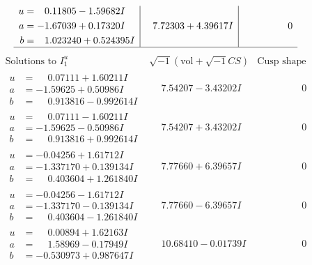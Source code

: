 \documentclass[1p]{elsarticle_modified}
\theoremstyle{definition}
\newcommand{\I}{\sqrt{-1}}
\begin{document}
$$\begin{array}{c|c|c}
\begin{aligned}
u &= \phantom{-}0.11805 - 1.59682 I \\
a &= -1.67039 + 0.17320 I \\
b &= \phantom{-}1.023240 + 0.524395 I\end{aligned}
 & \phantom{-}7.72303 + 4.39617 I & \phantom{-0.000000 } 0\\
 \hline 
 \end{array}$$\newpage$$\begin{array}{c|c|c}  
\text{Solutions to }I^u_{1}& \I (\text{vol} + \sqrt{-1}CS) & \text{Cusp shape}\\
 \hline 
\begin{aligned}
u &= \phantom{-}0.07111 + 1.60211 I \\
a &= -1.59625 + 0.50986 I \\
b &= \phantom{-}0.913816 - 0.992614 I\end{aligned}
 & \phantom{-}7.54207 - 3.43202 I & \phantom{-0.000000 } 0 \\ \hline\begin{aligned}
u &= \phantom{-}0.07111 - 1.60211 I \\
a &= -1.59625 - 0.50986 I \\
b &= \phantom{-}0.913816 + 0.992614 I\end{aligned}
 & \phantom{-}7.54207 + 3.43202 I & \phantom{-0.000000 } 0 \\ \hline\begin{aligned}
u &= -0.04256 + 1.61712 I \\
a &= -1.337170 + 0.139134 I \\
b &= \phantom{-}0.403604 + 1.261840 I\end{aligned}
 & \phantom{-}7.77660 + 6.39657 I & \phantom{-0.000000 } 0 \\ \hline\begin{aligned}
u &= -0.04256 - 1.61712 I \\
a &= -1.337170 - 0.139134 I \\
b &= \phantom{-}0.403604 - 1.261840 I\end{aligned}
 & \phantom{-}7.77660 - 6.39657 I & \phantom{-0.000000 } 0 \\ \hline\begin{aligned}
u &= \phantom{-}0.00894 + 1.62163 I \\
a &= \phantom{-}1.58969 - 0.17949 I \\
b &= -0.530973 + 0.987647 I\end{aligned}
 & \phantom{-}10.68410 - 0.01739 I & \phantom{-0.000000 } 0 \\ \hline\begin{aligned}

\end{aligned}
\end{array}$$
\end{document}
